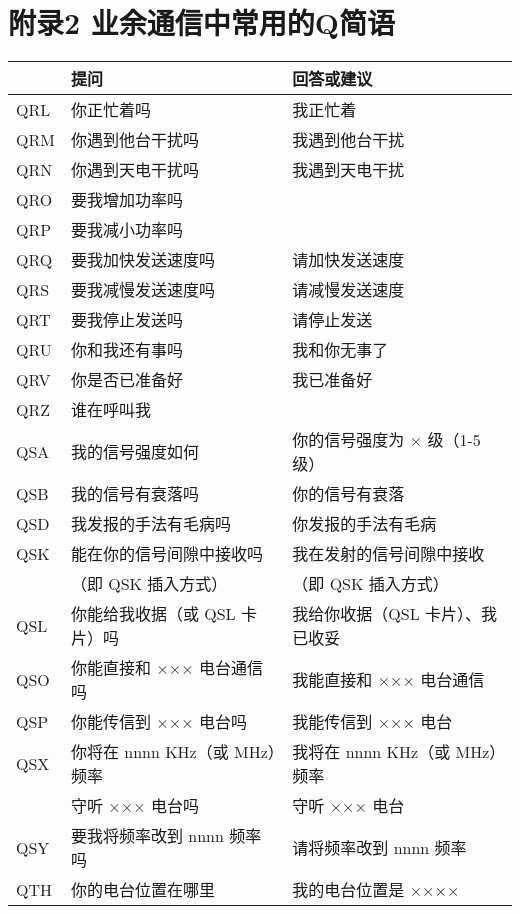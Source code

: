 \newpage

\section{附录2 业余通信中常用的Q简语}

\begin{tabular}{|l|l|l|}
	\hline
	    & \textbf{提问} & \textbf{回答或建议} \\
	\hline
	QRL & 你正忙着吗 & 我正忙着 \\
	\hline
	QRM & 你遇到他台干扰吗 & 我遇到他台干扰 \\
	\hline
	QRN & 你遇到天电干扰吗 & 我遇到天电干扰 \\
	\hline
	QRO & 要我增加功率吗 & \\
	\hline
	QRP & 要我减小功率吗 & \\
	\hline
	QRQ & 要我加快发送速度吗 & 请加快发送速度 \\
	\hline
	QRS & 要我减慢发送速度吗 & 请减慢发送速度 \\
	\hline
	QRT & 要我停止发送吗 & 请停止发送 \\
	\hline
	QRU & 你和我还有事吗 & 我和你无事了 \\
	\hline
	QRV & 你是否已准备好 & 我已准备好 \\
	\hline
	QRZ & 谁在呼叫我 & \\
	\hline
	QSA & 我的信号强度如何 & 你的信号强度为 × 级（1-5 级） \\
	\hline
	QSB & 我的信号有衰落吗 & 你的信号有衰落 \\
	\hline
	QSD & 我发报的手法有毛病吗 & 你发报的手法有毛病 \\
	\hline
	QSK & 能在你的信号间隙中接收吗 & 我在发射的信号间隙中接收 \\
	& （即 QSK 插入方式）    & （即 QSK 插入方式） \\
	\hline
	QSL & 你能给我收据（或 QSL 卡片）吗 & 我给你收据（QSL 卡片）、我已收妥 \\
	\hline
	QSO & 你能直接和 ××× 电台通信吗 & 我能直接和 ××× 电台通信 \\
	\hline
	QSP & 你能传信到 ××× 电台吗 & 我能传信到 ××× 电台 \\
	\hline
	QSX & 你将在 nnnn KHz（或 MHz）频率 & 我将在 nnnn KHz（或 MHz）频率 \\
	    & 守听 ××× 电台吗 & 守听 ××× 电台 \\
	\hline
	QSY & 要我将频率改到 nnnn 频率吗 & 请将频率改到 nnnn 频率 \\
	\hline
	QTH & 你的电台位置在哪里 & 我的电台位置是 ×××× \\
	\hline
\end{tabular}

